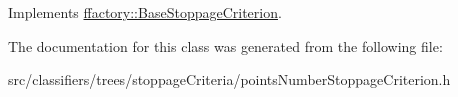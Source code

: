 Implements \hyperlink{classffactory_1_1_base_stoppage_criterion_a47728f0c9b241133e228ea5956248241}{ffactory\-::\-Base\-Stoppage\-Criterion}.



The documentation for this class was generated from the following file\-:\begin{DoxyCompactItemize}
\item 
src/classifiers/trees/stoppage\-Criteria/points\-Number\-Stoppage\-Criterion.\-h\end{DoxyCompactItemize}
